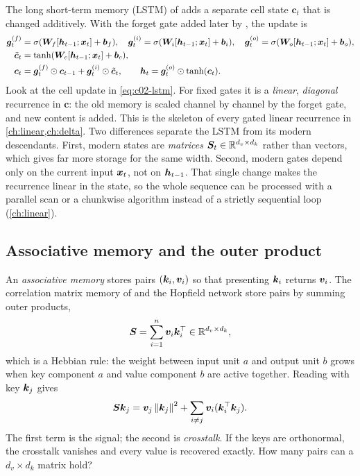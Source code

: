 The long short-term memory (LSTM) of \citet{hochreiter1997lstm} adds a separate cell state
$\bm{c}_t$ that is changed additively. With the forget gate added later by
\citet{c02-gers2000forget}, the update is
\begin{align}
  \bm{g}^{(f)}_t &= \sigma(\bm{W}_f[\bm{h}_{t-1}; \bm{x}_t] + \bm{b}_f), \quad
  \bm{g}^{(i)}_t = \sigma(\bm{W}_i[\bm{h}_{t-1}; \bm{x}_t] + \bm{b}_i), \quad
  \bm{g}^{(o)}_t = \sigma(\bm{W}_o[\bm{h}_{t-1}; \bm{x}_t] + \bm{b}_o), \nonumber\\
  \tilde{\bm{c}}_t &= \tanh(\bm{W}_c[\bm{h}_{t-1}; \bm{x}_t] + \bm{b}_c), \nonumber\\
  \bm{c}_t &= \bm{g}^{(f)}_t \odot \bm{c}_{t-1} + \bm{g}^{(i)}_t \odot \tilde{\bm{c}}_t, \qquad
  \bm{h}_t = \bm{g}^{(o)}_t \odot \tanh(\bm{c}_t). \label{eq:c02-lstm}
\end{align}
Look at the cell update in \eqref{eq:c02-lstm}. For fixed gates it is a \emph{linear},
\emph{diagonal} recurrence in $\bm{c}$: the old memory is scaled channel by channel by the forget
gate, and new content is added. This is the skeleton of every gated linear recurrence in
\cref{ch:linear,ch:delta}. Two differences separate the LSTM from its modern descendants. First,
modern states are \emph{matrices} $\bm{S}_t \in \mathbb{R}^{d_v \times d_k}$ rather than vectors, which gives
far more storage for the same width. Second, modern gates depend only on the current input
$\bm{x}_t$, not on $\bm{h}_{t-1}$. That single change makes the recurrence linear in the state, so the
whole sequence can be processed with a parallel scan or a chunkwise algorithm instead of a
strictly sequential loop (\cref{ch:linear}).

\subsection{Associative memory and the outer product}\label{sec:c02-assoc}

An \emph{associative memory} stores pairs $(\bm{k}_i, \bm{v}_i)$ so that presenting $\bm{k}_i$ returns
$\bm{v}_i$. The correlation matrix memory of \citet{c02-kohonen1972correlation} and the Hopfield
network \citep{c02-hopfield1982neural} store pairs by summing outer products,
\begin{equation}\label{eq:c02-hebb}
  \bm{S} = \sum_{i=1}^{n} \bm{v}_i \bm{k}_i^{\top} \in \mathbb{R}^{d_v \times d_k},
\end{equation}
which is a Hebbian rule: the weight between input unit $a$ and output unit $b$ grows when key
component $a$ and value component $b$ are active together. Reading with key $\bm{k}_j$ gives
\begin{equation}\label{eq:c02-crosstalk}
  \bm{S}\bm{k}_j = \bm{v}_j \left\lVert \bm{k}_j\right\rVert^2 + \sum_{i \ne j} \bm{v}_i (\bm{k}_i^{\top}\bm{k}_j).
\end{equation}
The first term is the signal; the second is \emph{crosstalk}. If the keys are orthonormal, the
crosstalk vanishes and every value is recovered exactly. How many pairs can a $d_v \times d_k$
matrix hold?

